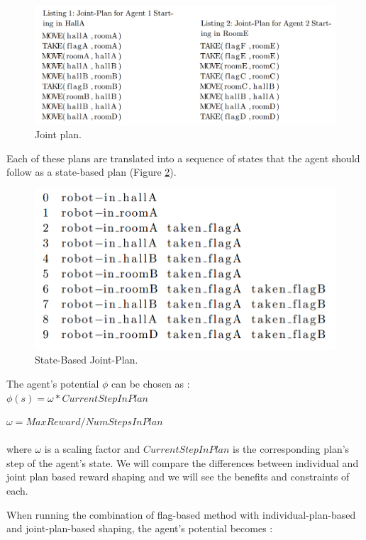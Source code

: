 \documentclass[letterpaper]{article}
\begin{document}
\begin{figure}[h!]
\centering
  \includegraphics[width=0.85\linewidth]{img/joinPlan.png}
  \caption{Joint plan.}
  \label{fig:plan2}
\end{figure}

Each of these plans are translated into a sequence of states that the agent should follow as a state-based plan (Figure \ref{fig:plan3}). 

\begin{figure}[h!]
\centering
  \includegraphics[width=0.85\linewidth]{img/listingFormattedJoinAgent1.png}
  \caption{State-Based Joint-Plan.}
  \label{fig:plan3}
\end{figure}

The agent's potential $\phi$ can be chosen as :\\

$\phi (s) = \omega * CurrentStepInPlan$

$\omega = MaxReward/NumStepsInPlan$\\\\
where $\omega$ is a scaling factor and $CurrentStepInPlan$ is the corresponding plan's step of the agent's state. We will compare the differences between individual and joint plan based reward shaping and we will see the benefits and constraints of each.

When running the combination of flag-based method with individual-plan-based and joint-plan-based shaping, the agent's potential becomes :\\
\end{document}
